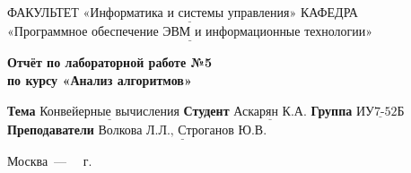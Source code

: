 \begin{titlepage}
	
	\noindent ФАКУЛЬТЕТ $\underline{\text{«Информатика и системы управления»}}$ \newline\newline
	\noindent КАФЕДРА $\underline{\text{«Программное обеспечение ЭВМ и информационные технологии»}}$\newline\newline\newline\newline\newline\newline\newline
	
	\vspace{\baselineskip}

	\begin{center}
		\Large\textbf{Отчёт по лабораторной работе №5} \\
		\Large\textbf{по курсу «Анализ алгоритмов»} \\
	\end{center}
	\vspace{2.5cm}
	
	\noindent\textbf{Тема} $\underline{\text{Конвейерные вычисления}}$\newline\newline
	\noindent\textbf{Студент} $\underline{\text{Аскарян К.А.}}$\newline\newline
	\noindent\textbf{Группа} $\underline{\text{ИУ7-52Б}}$\newline\newline
	\noindent\textbf{Преподаватели} $\underline{\text{Волкова Л.Л., Строганов Ю.В.}}$\newline
	
	\begin{center}
		\vfill
		Москва~---~\the\year
		~г.
	\end{center}
	\restoregeometry
\end{titlepage}